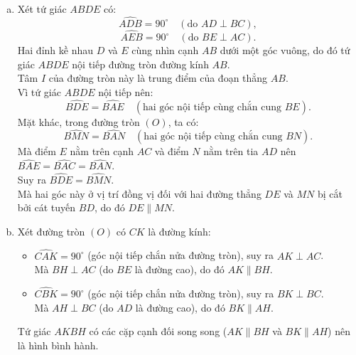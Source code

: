 \begin{bt}
{\begin{center}
	\end{center}
	\begin{enumerate}[a)]
		\item Xét tứ giác $ABDE$ có:
		$$\widehat{ADB} = 90^\circ \quad (\text{do } AD \perp BC),$$
		$$\widehat{AEB} = 90^\circ \quad (\text{do } BE \perp AC).$$
		Hai đỉnh kề nhau $D$ và $E$ cùng nhìn cạnh $AB$ dưới một góc vuông, do đó tứ giác $ABDE$ nội tiếp đường tròn đường kính $AB$.\\
		Tâm $I$ của đường tròn này là trung điểm của đoạn thẳng $AB$.\\
		Vì tứ giác $ABDE$ nội tiếp nên:
		$$\widehat{BDE} = \widehat{BAE} \quad (\text{hai góc nội tiếp cùng chắn cung } BE).$$
		Mặt khác, trong đường tròn $(O)$, ta có:
		$$\widehat{BMN} = \widehat{BAN} \quad (\text{hai góc nội tiếp cùng chắn cung } BN).$$
		Mà điểm $E$ nằm trên cạnh $AC$ và điểm $N$ nằm trên tia $AD$ nên $\widehat{BAE} = \widehat{BAC} = \widehat{BAN}$.\\
		Suy ra $\widehat{BDE} = \widehat{BMN}$.\\
		Mà hai góc này ở vị trí đồng vị đối với hai đường thẳng $DE$ và $MN$ bị cắt bởi cát tuyến $BD$, do đó $DE \parallel MN$.
		\item Xét đường tròn $(O)$ có $CK$ là đường kính:
		\begin{itemize}
			\item $\widehat{CAK} = 90^\circ$ (góc nội tiếp chắn nửa đường tròn), suy ra $AK \perp AC$.\\
			Mà $BH \perp AC$ (do $BE$ là đường cao), do đó $AK \parallel BH$.
			\item $\widehat{CBK} = 90^\circ$ (góc nội tiếp chắn nửa đường tròn), suy ra $BK \perp BC$.\\
			Mà $AH \perp BC$ (do $AD$ là đường cao), do đó $BK \parallel AH$.
		\end{itemize}
		Tứ giác $AKBH$ có các cặp cạnh đối song song ($AK \parallel BH$ và $BK \parallel AH$) nên là hình bình hành.\\

\end{enumerate}}
\end{bt}
